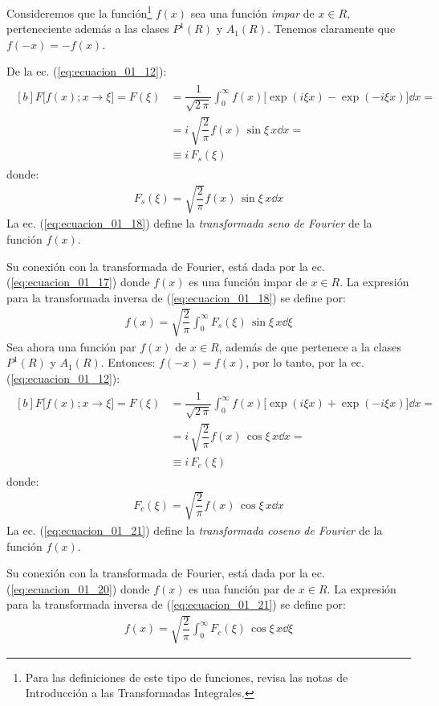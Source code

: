 Consideremos que la función\footnote{Para las definiciones de este tipo de funciones, revisa las notas de Introducción a las Transformadas Integrales.} $f(x)$ sea una función \emph{impar} de $x \in R$, perteneciente además a las clases $P^{1} (R)$ y $A_{1} (R)$. Tenemos claramente que $f(-x) = - f(x)$. 
\par
De la ec. (\ref{eq:ecuacion_01_12}):
\begin{align}
\begin{aligned}[b]
F \big[ f(x); x \to \xi \big] = F(\xi) &= \dfrac{1}{\sqrt{2 \, \pi}} \int_{0}^{\infty} f(x) \big[\exp(i \xi x) {-} \exp(-i \xi x) \big] \dd{x} = \\[0.5em]
&= i \, \sqrt{\dfrac{2}{\pi}} f(x) \, \sin \xi \, x \dd{x} = \\[0.5em]
&\equiv i \, F_{s} (\xi)
\end{aligned}
\label{eq:ecuacion_01_17}
\end{align}
donde:
\begin{align}
F_{s} (\xi) = \sqrt{\dfrac{2}{\pi}} f(x) \, \sin \xi \, x \dd{x}
\label{eq:ecuacion_01_18}
\end{align}
La ec. (\ref{eq:ecuacion_01_18}) define la \emph{transformada seno de Fourier} de la función $f(x)$.
\par
Su conexión con la transformada de Fourier, está dada por la ec. (\ref{eq:ecuacion_01_17}) donde $f (x)$ es una función impar de $x \in R$. La expresión para la transformada inversa de (\ref{eq:ecuacion_01_18}) se define por:
\begin{align}
f(x) = \sqrt{\dfrac{2}{\pi}} \int_{0}^{\infty} F_{s}(\xi) \, \sin \xi \, x \dd{\xi}
\label{eq:ecuacion_01_19}
\end{align}
Sea ahora una función par $f(x)$ de $x \in R$, además de que pertenece a la clases $P^{1}(R)$ y $A_{1}(R)$. Entonces: $f(-x) = f(x)$, por lo tanto, por la ec. (\ref{eq:ecuacion_01_12}):
\begin{align}
\begin{aligned}[b]
F \big[ f(x); x \to \xi \big] = F(\xi) &= \dfrac{1}{\sqrt{2 \, \pi}} \int_{0}^{\infty} f(x) \big[\exp(i \xi x) {+} \exp(-i \xi x) \big] \dd{x} = \\[0.5em]
&= i \, \sqrt{\dfrac{2}{\pi}} f(x) \, \cos \xi \, x \dd{x} = \\[0.5em]
&\equiv i \, F_{c} (\xi)    
\end{aligned}
\label{eq:ecuacion_01_20}
\end{align}
donde:
\begin{align}
F_{c} (\xi) = \sqrt{\dfrac{2}{\pi}} f(x) \, \cos \xi \, x \dd{x}
\label{eq:ecuacion_01_21}
\end{align}
La ec. (\ref{eq:ecuacion_01_21}) define la \emph{transformada coseno de Fourier} de la función $f(x)$.
\par
Su conexión con la transformada de Fourier, está dada por la ec. (\ref{eq:ecuacion_01_20}) donde $f (x)$ es una función par de $x \in R$. La expresión para la transformada inversa de (\ref{eq:ecuacion_01_21}) se define por:
\begin{align}
f(x) = \sqrt{\dfrac{2}{\pi}} \int_{0}^{\infty} F_{c}(\xi) \, \cos \xi \, x \dd{\xi}
\label{eq:ecuacion_01_22}
\end{align}

